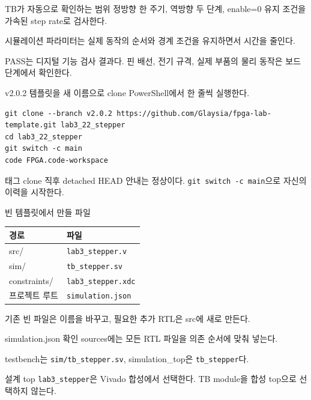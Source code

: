 \begin{frame}{TB가 자동으로 확인하는 범위}
\small
정방향 한 주기, 역방향 두 단계, enable=0 유지 조건을 가속된 step rate로 검사한다.\par\vspace{0.28cm}
시뮬레이션 파라미터는 실제 동작의 순서와 경계 조건을 유지하면서 시간을 줄인다.\par\vspace{0.28cm}
PASS는 디지털 기능 검사 결과다. 핀 배선, 전기 규격, 실제 부품의 물리 동작은 보드 단계에서 확인한다.
\end{frame}

\begin{frame}[fragile,label=start]{v2.0.2 템플릿을 새 이름으로 clone}
\small
PowerShell에서 한 줄씩 실행한다.
\begin{lstlisting}[language={}]
git clone --branch v2.0.2 https://github.com/Glaysia/fpga-lab-template.git lab3_22_stepper
cd lab3_22_stepper
git switch -c main
code FPGA.code-workspace
\end{lstlisting}
태그 clone 직후 detached HEAD 안내는 정상이다. \texttt{git switch -c main}으로 자신의 이력을 시작한다.
\end{frame}

\begin{frame}{빈 템플릿에서 만들 파일}
\small
\begin{center}\renewcommand{\arraystretch}{1.35}\begin{tabular}{>{\raggedright\arraybackslash}p{2.25cm}p{7.2cm}}
경로 & 파일\\\hline
src/ & \texttt{lab3\_stepper.v}\\
sim/ & \texttt{tb\_stepper.sv}\\
constraints/ & \texttt{lab3\_stepper.xdc}\\
프로젝트 루트 & \texttt{simulation.json}\\
\end{tabular}\end{center}
기존 빈 파일은 이름을 바꾸고, 필요한 추가 RTL은 src에 새로 만든다.
\end{frame}

\begin{frame}{simulation.json 확인}
\small
sources에는 모든 RTL 파일을 의존 순서에 맞춰 넣는다.\par\vspace{0.25cm}
testbench는 \texttt{sim/tb\_stepper.sv}, simulation\_top은 \texttt{tb\_stepper}다.\par\vspace{0.25cm}
설계 top \texttt{lab3\_stepper}은 Vivado 합성에서 선택한다. TB module을 합성 top으로 선택하지 않는다.
\end{frame}

